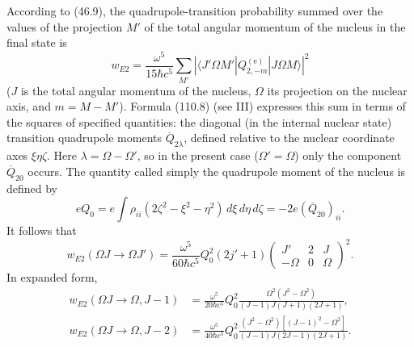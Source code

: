 According to (46.9), the quadrupole-transition probability summed over the values of the projection $M'$ of the total angular momentum of the nucleus in the final state is
\[
w_{E2}=\frac{\omega^5}{15\hbar c^5}\sum_{M'}
\left|\langle J'\Omega M'|Q_{2,-m}^{(\text{e})}|J\Omega M\rangle\right|^2
\]
($J$ is the total angular momentum of the nucleus, $\Omega$ its projection on the nuclear axis, and $m=M-M'$). Formula (110.8) (see III) expresses this sum in terms of the squares of specified quantities: the diagonal (in the internal nuclear state) transition quadrupole moments $\overline Q_{2\lambda}$, defined relative to the nuclear coordinate axes $\xi\eta\zeta$. Here $\lambda=\Omega-\Omega'$, so in the present case ($\Omega'=\Omega$) only the component $\overline Q_{20}$ occurs. The quantity called simply the quadrupole moment of the nucleus is defined by
\[
eQ_0=e\int\rho_{ii}(2\zeta^2-\xi^2-\eta^2)\,d\xi\,d\eta\,d\zeta
=-2e(\overline Q_{20})_{ii}.
\]
It follows that
\begin{equation}
w_{E2}(\Omega J\to\Omega J')
=\frac{\omega^5}{60\hbar c^5}Q_0^2(2j'+1)
\begin{pmatrix}J'&2&J\\-\Omega&0&\Omega\end{pmatrix}^{\!2}.
\tag{55.3}
\end{equation}
In expanded form,
\[
\begin{aligned}
w_{E2}(\Omega J\to\Omega,J-1)
&=\frac{\omega^5}{20\hbar c^5}Q_0^2
\frac{\Omega^2(J^2-\Omega^2)}
{(J-1)J(J+1)(2J+1)},\\
w_{E2}(\Omega J\to\Omega,J-2)
&=\frac{\omega^5}{40\hbar c^5}Q_0^2
\frac{(J^2-\Omega^2)[(J-1)^2-\Omega^2]}
{(J-1)J(2J-1)(2J+1)}.
\end{aligned}
\]

